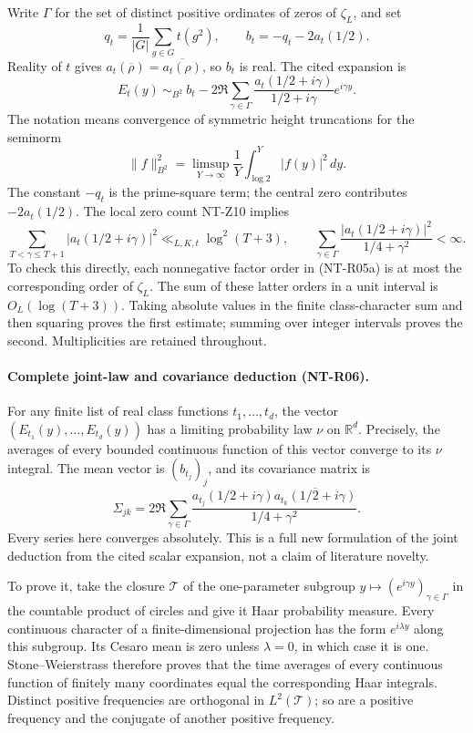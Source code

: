 Write $\Gamma$ for the set of distinct positive ordinates of zeros
of $\zeta_L$, and set
\[
 q_t=\frac1{|G|}\sum_{g\in G}t(g^2),\qquad
 b_t=-q_t-2a_t(1/2).
\]
Reality of $t$ gives $a_t(\overline\rho)=\overline{a_t(\rho)}$,
so $b_t$ is real. The cited expansion is
\[
 E_t(y)\ \sim_{B^2}\ b_t-
       2\Re\sum_{\gamma\in\Gamma}
        \frac{a_t(1/2+i\gamma)}{1/2+i\gamma}e^{i\gamma y}.
 \tag{NT-R05b}
\]
The notation means convergence of symmetric height truncations for
the seminorm
\[
 \|f\|_{B^2}^2=\limsup_{Y\to\infty}\frac1Y
                     \int_{\log2}^Y|f(y)|^2\,dy.
\]
The constant $-q_t$ is the prime-square term; the central zero
contributes $-2a_t(1/2)$. The local zero count NT-Z10 implies
\[
 \sum_{T<\gamma\le T+1}|a_t(1/2+i\gamma)|^2
       \ll_{L,K,t}\log^2(T+3),\qquad
 \sum_{\gamma\in\Gamma}
 \frac{|a_t(1/2+i\gamma)|^2}{1/4+\gamma^2}<\infty.
 \tag{NT-R05c}
\]
To check this directly, each nonnegative factor order in
(NT-R05a) is at most the corresponding order of $\zeta_L$.
The sum of these latter orders in a unit interval is $O_L(\log(T+3))$.
Taking absolute values in the finite class-character sum and then
squaring proves the first estimate; summing over integer intervals
proves the second. Multiplicities are retained throughout.

\paragraph{Complete joint-law and covariance deduction (NT-R06).}
For any finite list of real class functions $t_1,\ldots,t_d$, the
vector $(E_{t_1}(y),\ldots,E_{t_d}(y))$ has a limiting probability
law $\nu$ on $\mathbb R^d$. Precisely, the averages of every bounded
continuous function of this vector converge to its $\nu$ integral.
The mean vector is $(b_{t_j})_j$, and its covariance matrix is
\[
 \Sigma_{jk}=2\Re\sum_{\gamma\in\Gamma}
       \frac{a_{t_j}(1/2+i\gamma)
             \overline{a_{t_k}(1/2+i\gamma)}}{1/4+\gamma^2}.
 \tag{NT-R06a}
\]
Every series here converges absolutely. This is a full new
formulation of the joint deduction from the cited scalar expansion,
not a claim of literature novelty.

To prove it, take the closure $\mathcal T$ of the one-parameter
subgroup
$y\mapsto(e^{i\gamma y})_{\gamma\in\Gamma}$ in the countable
product of circles and give it Haar probability measure. Every
continuous character of a finite-dimensional projection has the
form $e^{i\lambda y}$ along this subgroup. Its Cesaro mean is zero
unless $\lambda=0$, in which case it is one. Stone--Weierstrass
therefore proves that the time averages of every continuous
function of finitely many coordinates equal the corresponding
Haar integrals. Distinct positive frequencies are orthogonal in
$L^2(\mathcal T)$; so are a positive frequency and the conjugate of
another positive frequency.

